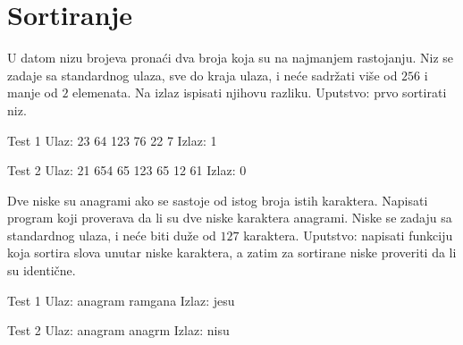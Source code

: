 \section{Sortiranje}


\begin{Exercise}[label=501]
  U datom nizu brojeva pronaći dva broja koja su na najmanjem
  rastojanju. Niz se zadaje sa standardnog ulaza, sve do kraja ulaza,
  i neće sadržati više od $256$ i manje od $2$ elemenata. Na izlaz
  ispisati njihovu razliku.  Uputstvo: prvo sortirati niz.
  
\begin{miditest}
\begin{test}{Test 1}
Ulaz:   23 64 123 76 22 7
Izlaz:  1
\end{test}
\end{miditest}

\begin{miditest}
\begin{test}{Test 2}
Ulaz:   21 654 65 123 65 12 61
Izlaz:  0
\end{test}
\end{miditest}
  
\end{Exercise}

\begin{Answer}[ref=501]
\end{Answer}
\begin{Exercise}[label=502]
  Dve niske su anagrami ako se sastoje od istog broja istih
  karaktera. Napisati program koji proverava da li su dve niske
  karaktera anagrami.  Niske se zadaju sa standardnog ulaza, i neće
  biti duže od $127$ karaktera.  Uputstvo: napisati funkciju koja
  sortira slova unutar niske karaktera, a zatim za sortirane niske
  proveriti da li su identične.
  
\begin{miditest}
\begin{test}{Test 1}
Ulaz:   anagram ramgana
Izlaz:  jesu
\end{test}
\end{miditest}
\begin{miditest}
\begin{test}{Test 2}
Ulaz:   anagram anagrm
Izlaz:  nisu
\end{test}
\end{miditest}
  
\end{Exercise}

